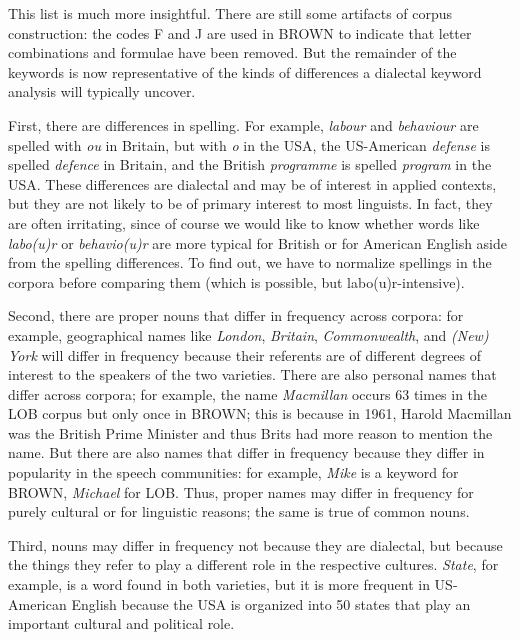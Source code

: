 This list is much more insightful. There are still some artifacts of corpus construction: the codes  F and J are used in BROWN  to indicate that letter combinations and formulae have been removed. But the remainder of the keywords  is now representative  of the kinds of differences a dialectal keyword analysis will typically uncover.

First, there are differences in spelling. For example, \textit{labour} and \textit{behaviour} are spelled with \textit{ou} in Britain, but with \textit{o} in the USA, the US\hyp{}American  \textit{defense} is spelled \textit{defence} in Britain, and the British  \textit{programme} is spelled \textit{program} in the USA. These differences are dialectal and may be of interest in applied contexts, but they are not likely to be of primary interest to most linguists. In fact, they are often irritating, since of course we would like to know whether words like \textit{labo(u)r} or \textit{behavio(u)r} are more typical for British  or for American English aside from the spelling differences. To find out, we have to normalize spellings in the corpora before comparing them (which is possible, but labo(u)r\hyp{}intensive).

Second, there are proper nouns  that differ in frequency  across corpora: for example, geographical names like \textit{London}, \textit{Britain}, \textit{Commonwealth}, and \textit{(New) York} will differ in frequency because their referents are of different degrees of interest to the speakers of the two varieties.  There are also personal names that differ across corpora; for example, the name \textit{Macmillan} occurs 63 times in the LOB  corpus but only once in BROWN;  this is because in 1961, Harold Macmillan was the British  Prime Minister and thus Brits had more reason to mention the name. But there are also names that differ in frequency  because they differ in popularity in the speech communities: for example, \textit{Mike} is a keyword  for BROWN,  \textit{Michael} for LOB.  Thus, proper names may differ in frequency for purely cultural  or for linguistic reasons; the same is true of common  nouns.

Third, nouns  may differ in frequency  not because they are dialectal, but because the things they refer to play a different role in the respective cultures.  \textit{State}, for example, is a word found in both varieties,  but it is more frequent in US\hyp{}American  English because the USA is organized into 50 states that play an important cultural and political role.

